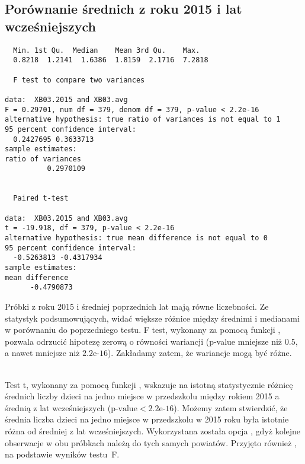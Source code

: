 \newpage
\subsection*{Porównanie średnich z roku 2015 i lat wcześniejszych}

\begin{verbatim}
  Min. 1st Qu.  Median    Mean 3rd Qu.    Max. 
  0.8218  1.2141  1.6386  1.8159  2.1716  7.2818 

  F test to compare two variances

data:  XB03.2015 and XB03.avg
F = 0.29701, num df = 379, denom df = 379, p-value < 2.2e-16
alternative hypothesis: true ratio of variances is not equal to 1
95 percent confidence interval:
  0.2427695 0.3633713
sample estimates:
ratio of variances 
          0.2970109 


  Paired t-test

data:  XB03.2015 and XB03.avg
t = -19.918, df = 379, p-value < 2.2e-16
alternative hypothesis: true mean difference is not equal to 0
95 percent confidence interval:
  -0.5263813 -0.4317934
sample estimates:
mean difference 
      -0.4790873 

\end{verbatim}



Próbki z roku 2015 i średniej poprzednich lat mają równe liczebności.
Ze statystyk podsumowujących, widać większe różnice między średnimi i medianami w porównaniu do poprzedniego testu.
F test, wykonany za pomocą funkcji , pozwala odrzucić hipotezę zerową o równości wariancji (p-value mniejsze niż $0.5$, a nawet mniejsze niż $2.2$e-$16$).
Zakładamy zatem, że wariancje mogą być różne.

\ \\
Test t, wykonany za pomocą funkcji , wskazuje na istotną statystycznie różnicę średnich liczby dzieci na jedno miejsce w przedszkolu między rokiem 2015 a średnią z lat wcześniejszych ($\text{p-value} < 2.2\text{e-}16$). Możemy zatem stwierdzić, że średnia liczba dzieci na jedno miejsce w przedszkolu w 2015 roku była istotnie różna od średniej z lat wcześniejszych.
Wykorzystana została opcja , gdyż kolejne obserwacje w
obu próbkach należą do tych samych powiatów. Przyjęto również , na podstawie wyników testu~F.






